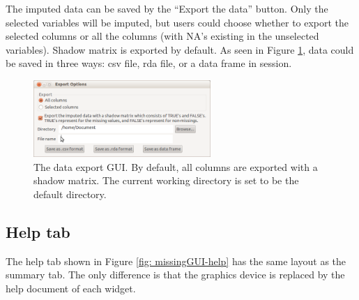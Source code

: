 \documentclass[article]{jss}
\begin{document}
The imputed data can be saved by the ``Export the data'' button. Only the selected variables will be imputed, but users could choose whether to export the selected columns or all the columns (with NA's existing in the unselected variables). Shadow matrix is exported by default. As seen in Figure \ref{fig: export}, data could be saved in three ways: csv file, rda file, or a data frame in  session.

\begin{center}
\begin{figure}[h]
\begin{centering}
\includegraphics[width=0.6\textwidth]{fig7}
\par\end{centering}
\caption{The data export GUI. By default, all columns are exported with a shadow matrix. The current working directory is set to be the default directory.}
\label{fig: export}
\end{figure}
\par\end{center}


\subsection{Help tab}

The help tab shown in Figure \ref{fig: missingGUI-help} has the same layout as the summary tab. The only difference is that the graphics device is replaced by the help document of each widget.
\end{document}
